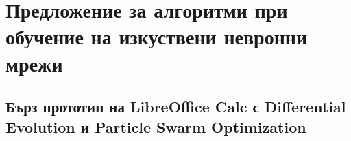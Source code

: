 ﻿\chapter{Предложение за алгоритми при обучение на изкуствени невронни мрежи}

\section{Бърз прототип на LibreOffice Calc с Differential Evolution и Particle Swarm Optimization}


